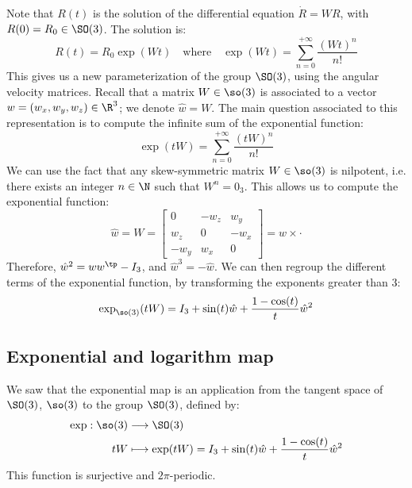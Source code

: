 Note that $R(t)$ is the solution of the differential equation $\dot R = WR$, with $R(0)=R_0\in\SO(3)$. The solution is:
\begin{equation*}
    R(t) = R_0\exp(Wt) \quad\text{where}\quad \exp(Wt) = \sum_{n=0}^{+\infty}\frac{(Wt)^n}{n!}
\end{equation*}
This gives us a new parameterization of the group $\SO(3)$, using the angular velocity matrices. Recall that a matrix $W\in\so(3)$ is associated to a vector $w=(w_x, w_y, w_z)\in\R^3$; we denote $\hat{w}=W$. The main question associated to this representation is to compute the infinite sum of the exponential function:
\begin{equation}
    \exp(tW)=\sum_{n=0}^{+\infty}\frac{(tW)^n}{n!}
\end{equation}
We can use the fact that any skew-symmetric matrix $W\in\so(3)$ is nilpotent, i.e. there exists an integer $n\in\N$ such that $W^n=0_3$. This allows us to compute the exponential function:
\begin{equation*}
    \hat{w}=W=\begin{bmatrix}
        0 & -w_z & w_y \\
        w_z & 0 & -w_x \\
        -w_y & w_x & 0
    \end{bmatrix} = w \times \cdot
\end{equation*}
Therefore, $\hat{w}^2=ww^\tp-I_3$, and $\hat{w}^3=-\hat{w}$. We can then regroup the different terms of the exponential function, by transforming the exponents greater than 3:
\begin{equation}
    \exp_{\so(3)}(tW)=I_3+\sin(t)\hat{w}+\frac{1-\cos(t)}{t}\hat{w}^2
\end{equation}

\subsection{Exponential and logarithm map}
We saw that the exponential map is an application from the tangent space of $\SO(3)$, $\so(3)$ to the group $\SO(3)$, defined by:
\begin{align*}
    \exp:\so(3)&\longrightarrow\SO(3)\\
    tW&\longmapsto\exp(tW) = I_3 + \sin(t)\hat{w} + \frac{1-\cos(t)}{t}\hat{w}^2
\end{align*}
This function is surjective and $2\pi$-periodic.

